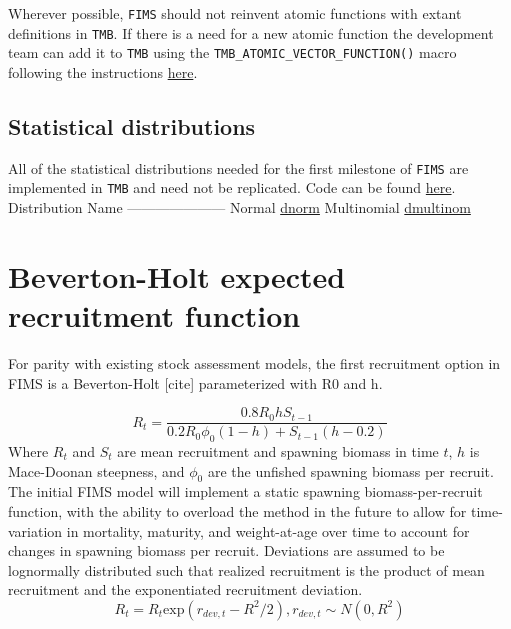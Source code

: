 \documentclass[
]{book}
\begin{document}
Wherever possible, \texttt{FIMS} should not reinvent atomic functions with extant definitions in \texttt{TMB}. If there is a need for a new atomic function the development team can add it to \texttt{TMB} using the \texttt{TMB\_ATOMIC\_VECTOR\_FUNCTION()} macro following the instructions \href{https://kaskr.github.io/adcomp/_book/AtomicFunctions.html\#example-adding-new-primitive-function-with-known-derivatives}{here}.

\hypertarget{statistical-distributions}{%
\subsection{Statistical distributions}\label{statistical-distributions}}

All of the statistical distributions needed for the first milestone of \texttt{FIMS} are implemented in \texttt{TMB} and need not be replicated.
Code can be found \href{http://kaskr.github.io/adcomp/group__R__style__distribution.html}{here}.
\textbar Distribution \textbar{} Name\textbar{}
\textbar{} ------------\textbar---------\textbar{}
\textbar Normal \textbar{} \href{http://kaskr.github.io/adcomp/dnorm_8hpp.html}{dnorm}\textbar{}
\textbar Multinomial \textbar{} \href{http://kaskr.github.io/adcomp/group__R__style__distribution.html\#gafd0ae6b53840267138bb9250115fbe8b}{dmultinom}\\

\hypertarget{beverton-holt-expected-recruitment-function}{%
\section{Beverton-Holt expected recruitment function}\label{beverton-holt-expected-recruitment-function}}

For parity with existing stock assessment models, the first recruitment option in FIMS is a Beverton-Holt {[}cite{]} parameterized with R0 and h.

\[R_t  =\frac{0.8R_0hS_{t-1}}{0.2R_0\phi_0(1-h) + S_{t-1}(h-0.2)}\]
Where \(R_t\) and \(S_t\) are mean recruitment and spawning biomass in time \(t\), \(h\) is Mace-Doonan steepness, and \(\phi_0\) are the unfished spawning biomass per recruit. The initial FIMS model will implement a static spawning biomass-per-recruit function, with the ability to overload the method in the future to allow for time-variation in mortality, maturity, and weight-at-age over time to account for changes in spawning biomass per recruit. Deviations are assumed to be lognormally distributed such that realized recruitment is the product of mean recruitment and the exponentiated recruitment deviation.
\[R_t = R_t\mathrm{exp}(r_{dev,t}-R^2/2),   r_{dev,t} \sim N(0,R^2)\]
\end{document}
